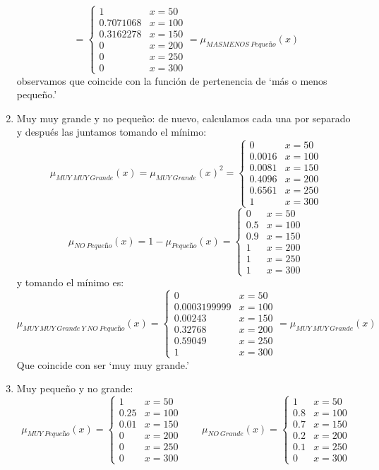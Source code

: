 \documentclass[
]{article}
\begin{document}
\begin{enumerate}
  \[=\begin{cases}
  1 & x=50\\
  0.7071068 & x=100\\
  0.3162278 & x=150\\
  0 & x=200\\
  0 & x=250\\
  0 & x=300
  \end{cases}=\mu_{MASMENOS\ Pequeño}\left(x\right)\] observamos que
  coincide con la función de pertenencia de `más o menos pequeño.'
\item
  Muy muy grande y no pequeño: de nuevo, calculamos cada una por
  separado y después las juntamos tomando el mínimo:
  \[\mu_{MUY\ MUY\ Grande}\left(x\right)=\mu_{MUY\ Grande}\left(x\right)^{2}=\begin{cases}
  0 & x=50\\
  0.0016 & x=100\\
  0.0081 & x=150\\
  0.4096 & x=200\\
  0.6561 & x=250\\
  1 & x=300
  \end{cases}\]
  \[\mu_{NO\ Pequeño}\left(x\right)=1-\mu_{Pequeño}\left(x\right)=\begin{cases}
  0 & x=50\\
  0.5 & x=100\\
  0.9 & x=150\\
  1 & x=200\\
  1 & x=250\\
  1 & x=300
  \end{cases}\] y tomando el mínimo es:
  \[\mu_{MUY\ MUY\ Grande\ Y\ NO\ Pequeño}\left(x\right)=\begin{cases}
  0 & x=50\\
  0.0003199999 & x=100\\
  0.00243 & x=150\\
  0.32768 & x=200\\
  0.59049 & x=250\\
  1 & x=300
  \end{cases}=\mu_{MUY\ MUY\ Grande}\left(x\right)\] Que coincide con
  ser `muy muy grande.'
\item
  Muy pequeño y no grande:
  \[\mu_{MUY\ Pequeño}\left(x\right)=\begin{cases}
  1 & x=50\\
  0.25 & x=100\\
  0.01 & x=150\\
  0 & x=200\\
  0 & x=250\\
  0 & x=300
  \end{cases} \qquad \mu_{NO\ Grande}\left(x\right)=\begin{cases}
  1 & x=50\\
  0.8 & x=100\\
  0.7 & x=150\\
  0.2 & x=200\\
  0.1 & x=250\\
  0 & x=300
  \end{cases}\]
\end{enumerate}
\end{document}
